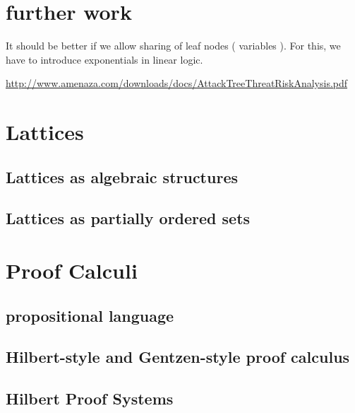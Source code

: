 \maketitle














\section{further work}

It should be better if we allow sharing of leaf nodes ( variables ).  For this, we have to introduce exponentials in linear logic. 

\url{http://www.amenaza.com/downloads/docs/AttackTreeThreatRiskAnalysis.pdf}

\appendix 

\section{Lattices}
	\subsection{Lattices as algebraic structures}
		
	\subsection{Lattices as partially ordered sets}
		

\section{Proof Calculi}
	\subsection{propositional language}
		
	\subsection{Hilbert-style and Gentzen-style proof calculus} 
		
	\subsection{Hilbert Proof Systems}
		
